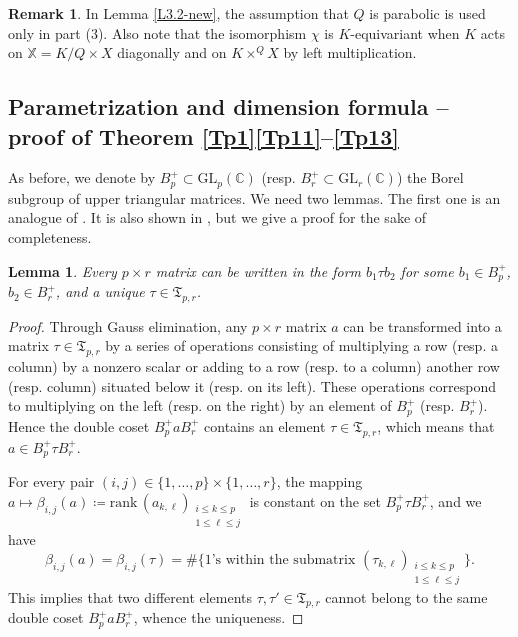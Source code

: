 \documentclass[11pt]{article}
\newtheorem{lemma}[theo]{Lemma}
\theoremstyle{definition}
\newtheorem{rema}[theo]{Remark}
\numberwithin{equation}{section}
\newcommand{\card}[1]{\# #1}
\newcommand{\rank}{\mathrm{rank}}
\newcommand{\ppermutationsof}{\mathfrak{T}}
\newcommand{\GL}{\mathrm{GL}}
\newcommand{\mC}{\mathbb{C}}
\begin{document}
\begin{rema}
In Lemma \ref{L3.2-new}, the assumption that $Q$ is parabolic is used only in part (3).
Also note that the isomorphism $\chi$ is $K$-equivariant when $K$ acts on $\mathbb{X}=K/Q\times X$ diagonally and on $K\times^Q X$ by left multiplication.
\end{rema}

\subsection{Parametrization and dimension formula -- proof of  Theorem \ref{Tp1}\ref{Tp11}--\ref{Tp13}}\label{section-3.2}


As before, we denote by $B_p^+\subset\GL_p(\mC)$ (resp. $B_r^+\subset\GL_r(\mC)$) the Borel subgroup of upper triangular matrices. We need two lemmas. The first one is an analogue of \cite[Proposition 6.3]{FN2}.
It is also shown in \cite[p.~390]{Fulton-1991}, but we give a proof for the sake of completeness.

\begin{lemma}
\label{L3.2}
Every $p\times r$ matrix can be written in the form
$b_1\tau b_2$
for some $b_1\in B_p^+$, $b_2\in B_r^+$, and a unique $\tau\in\ppermutationsof_{p,r}$.
\end{lemma}

\begin{proof}
Through Gauss elimination, any $p\times r$ matrix $a$ can be
transformed into a matrix $\tau\in\ppermutationsof_{p,r}$ by a
series of operations consisting of multiplying a row (resp. a
column) by a nonzero scalar or adding to a row (resp. to a column)
another row (resp. column) situated below it (resp. on its left).
These operations correspond to multiplying on the left (resp. on
the right) by an element of $B_p^+$ (resp. $B_r^+$). Hence the
double coset $B_p^+aB_r^+$ contains an element
$\tau\in\ppermutationsof_{p,r}$, which means that $a\in
B_p^+ \tau B_r^+$.

For every pair $(i,j)\in\{1,\ldots,p\}\times\{1,\ldots,r\}$, the mapping $a\mapsto \beta_{i,j}(a)\coloneqq \rank\,(a_{k,\ell})_{\substack{i\leq k\leq p\\ 1\leq \ell\leq j}}$
is constant on the set $B_p^+\tau B_r^+$, and we have
\[\beta_{i,j}(a)=\beta_{i,j}(\tau)=\card\{\mbox{$1$'s within the submatrix $(\tau_{k,\ell})_{\substack{i\leq k\leq p\\ 1\leq \ell\leq j}}$}\}.\]
This implies that two different elements $\tau,\tau'\in\ppermutationsof_{p,r}$ cannot belong to the same double coset $B_p^+aB_r^+$, whence the uniqueness.
\end{proof}
\end{document}

